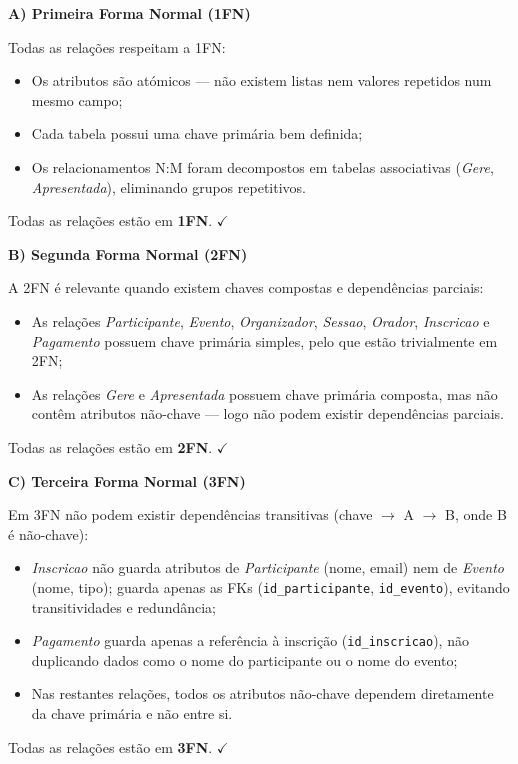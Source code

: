 \documentclass[runningheads]{llncs}
\begin{document}
                \noindent\textbf{A) Primeira Forma Normal (1FN)}

                Todas as relações respeitam a 1FN:
                \begin{itemize}
                    \item Os atributos são atómicos --- não existem listas nem valores repetidos num mesmo campo;
                    \item Cada tabela possui uma chave primária bem definida;
                    \item Os relacionamentos N:M foram decompostos em tabelas associativas (\textit{Gere},
                    \textit{Apresentada}), eliminando grupos repetitivos.
                \end{itemize}
                \noindent Todas as relações estão em \textbf{1FN}. $\checkmark$

                \vspace{0.3cm}
                \noindent\textbf{B) Segunda Forma Normal (2FN)}

                A 2FN é relevante quando existem chaves compostas e dependências parciais:
                \begin{itemize}
                    \item As relações \textit{Participante}, \textit{Evento}, \textit{Organizador},
                    \textit{Sessao}, \textit{Orador}, \textit{Inscricao} e \textit{Pagamento}
                    possuem chave primária simples, pelo que estão trivialmente em 2FN;
                    \item As relações \textit{Gere} e \textit{Apresentada} possuem
                    chave primária composta, mas não contêm atributos não-chave --- logo não podem
                    existir dependências parciais.
                \end{itemize}
                \noindent Todas as relações estão em \textbf{2FN}. $\checkmark$

                \vspace{0.3cm}
                \noindent\textbf{C) Terceira Forma Normal (3FN)}

                Em 3FN não podem existir dependências transitivas (chave $\to$ A $\to$ B, onde B é
                não-chave):
                \begin{itemize}
                    \item \textit{Inscricao} não guarda atributos de \textit{Participante} (nome, email)
                    nem de \textit{Evento} (nome, tipo); guarda apenas as FKs (\texttt{id\_participante},
                    \texttt{id\_evento}), evitando transitividades e redundância;
                    \item \textit{Pagamento} guarda apenas a referência à inscrição
                    (\texttt{id\_inscricao}), não duplicando dados como o nome do participante ou
                    o nome do evento;
                    \item Nas restantes relações, todos os atributos não-chave dependem diretamente
                    da chave primária e não entre si.
                \end{itemize}
                \noindent Todas as relações estão em \textbf{3FN}. $\checkmark$
\end{document}
